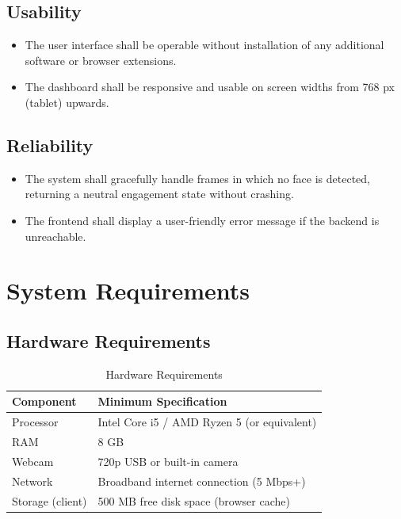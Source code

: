\subsection{Usability}
\begin{itemize}
    \item The user interface shall be operable without installation of any
          additional software or browser extensions.
    \item The dashboard shall be responsive and usable on screen widths
          from 768 px (tablet) upwards.
\end{itemize}

\subsection{Reliability}
\begin{itemize}
    \item The system shall gracefully handle frames in which no face is
          detected, returning a neutral engagement state without crashing.
    \item The frontend shall display a user-friendly error message if the
          backend is unreachable.
\end{itemize}

\section{System Requirements}

\subsection{Hardware Requirements}

\begin{table}[H]
\centering
\caption{Hardware Requirements}
\begin{tabular}{ll}
\toprule
\textbf{Component} & \textbf{Minimum Specification} \\
\midrule
Processor       & Intel Core i5 / AMD Ryzen 5 (or equivalent) \\
RAM             & 8 GB \\
Webcam          & 720p USB or built-in camera \\
Network         & Broadband internet connection (5 Mbps+) \\
Storage (client)& 500 MB free disk space (browser cache) \\
\bottomrule
\end{tabular}
\end{table}

